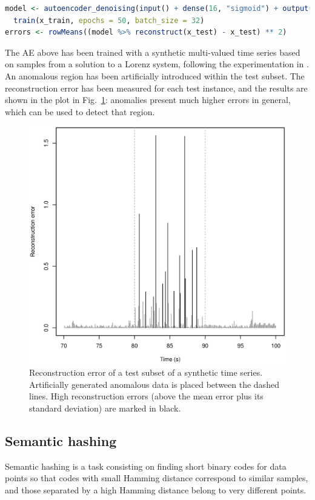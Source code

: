\begin{lstlisting}[language=R]
model <- autoencoder_denoising(input() + dense(16, "sigmoid") + output()) %>% 
  train(x_train, epochs = 50, batch_size = 32)
errors <- rowMeans((model %>% reconstruct(x_test) - x_test) ** 2)
\end{lstlisting}

The AE above has been trained with a synthetic multi-valued time series based on samples from a solution to a Lorenz system, following the experimentation in \cite{sakurada}. An anomalous region has been artificially introduced within the test subset. The reconstruction error has been measured for each test instance, and the results are shown in the plot in Fig.~\ref{p4fig:anomaly}: anomalies present much higher errors in general, which can be used to detect that region.

\begin{figure}[ht]
    \centering
    \includegraphics[width=.75\textwidth]{anomaly_detection_lorenz.eps}
    \caption{Reconstruction error of a test subset of a synthetic time series. Artificially generated anomalous data is placed between the dashed lines. High reconstruction errors (above the mean error plus its standard deviation) are marked in black.}
    \label{p4fig:anomaly}
\end{figure}

\subsection{Semantic hashing}
\label{p4sec.hashing}

Semantic hashing \cite{hinton} is a task consisting on finding short binary codes for data points so that codes with small Hamming distance correspond to similar samples, and those separated by a high Hamming distance belong to very different points.

